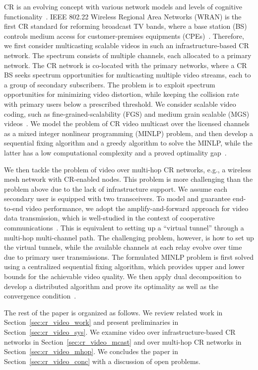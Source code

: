 \documentclass[12pt,onecolumn,draftclsnofoot]{IEEEtran} %
\begin{document}
CR is an evolving concept with various network models and levels of cognitive functionality~\cite{Zhao07a, Zhao09}. IEEE 802.22 Wireless Regional Area Networks (WRAN) is the first CR standard for reforming broadcast TV bands, where a base station (BS) controls medium access for customer-premises equipments (CPEs)~\cite{802.22STD}. Therefore, we first consider multicasting scalable videos in such an infrastructure-based CR network. The spectrum consists of multiple channels, each allocated to a primary network. The CR network is co-located with the primary networks, where a CR BS seeks spectrum opportunities for multicasting multiple video streams, each to a group of secondary subscribers. The problem is to exploit spectrum opportunities for minimizing video distortion, while keeping the collision rate with primary users below a prescribed threshold. We consider scalable video coding, such as fine-grained-scalability (FGS) and medium grain scalable (MGS) videos~\cite{Schaar03, Wien07}. We model the problem of CR video multicast over the licensed channels as a mixed integer nonlinear programming (MINLP) problem, and then develop a sequential fixing algorithm and a greedy algorithm to solve the MINLP, while the latter has a low computational complexity and a proved optimality gap~\cite{Hu09IC}.

We then tackle the problem of video over multi-hop CR networks, e.g., a wireless mesh network with CR-enabled nodes. This problem is more challenging than the problem above due to the lack of infrastructure support. We assume each secondary user is equipped with two transceivers. To model and guarantee end-to-end video performance, we adopt the amplify-and-forward approach for video data transmission, which is well-studied in the context of cooperative communications~\cite{Laneman04}. This is equivalent to setting up a ``virtual tunnel'' through a multi-hop multi-channel path. The challenging problem, however, is how to set up the virtual tunnels, while the available channels at each relay evolve over time due to primary user transmissions. 
The formulated MINLP problem is first solved using a centralized sequential fixing algorithm, which provides upper and lower bounds for the achievable video quality. We then apply dual decomposition to develop a distributed algorithm and prove its optimality as well as the convergence condition~\cite{Hu10TW}.  

The rest of the paper is organized as follows. We review related work in Section~\ref{sec:cr_video_work} and present preliminaries in Section~\ref{sec:cr_video_sys}. We examine video over infrastructure-based CR networks in Section~\ref{sec:cr_video_mcast} and over multi-hop CR networks in Section~\ref{sec:cr_video_mhop}. We concludes the paper in Section~\ref{sec:cr_video_conc} with a discussion of open problems.  
\end{document}
